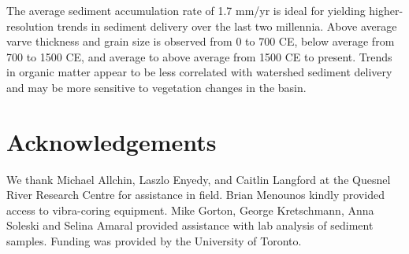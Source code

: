 \documentclass[Royal,times,doublespace,sageh]{sagej}
\begin{document}
The average sediment accumulation rate of 1.7 mm/yr is ideal for
yielding higher-resolution trends in sediment delivery over the last two
millennia. Above average varve thickness and grain size is observed from
0 to 700 CE, below average from 700 to 1500 CE, and average to above
average from 1500 CE to present. Trends in organic matter appear to be
less correlated with watershed sediment delivery and may be more
sensitive to vegetation changes in the basin.

\pagebreak

\hypertarget{acknowledgements}{%
\section{Acknowledgements}\label{acknowledgements}}

We thank Michael Allchin, Laszlo Enyedy, and Caitlin Langford at the
Quesnel River Research Centre for assistance in field. Brian Menounos
kindly provided access to vibra-coring equipment. Mike Gorton, George
Kretschmann, Anna Soleski and Selina Amaral provided assistance with lab
analysis of sediment samples. Funding was provided by the University of
Toronto.

\pagebreak



\end{document}
